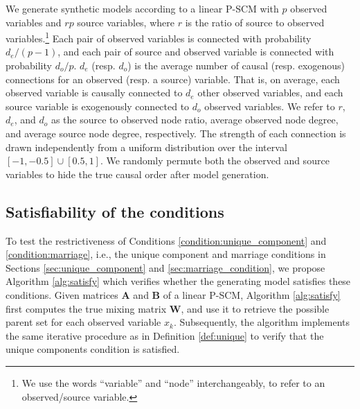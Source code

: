 \documentclass[12pt]{article}
\newcommand{\bA}{\mathbf{A}}
\newcommand{\bB}{\mathbf{B}}
\newcommand{\bW}{\mathbf{W}}
\begin{document}
We generate synthetic models according to a linear P-SCM with $p$ observed variables and $rp$ source variables, where $r$ is the ratio of source to observed variables.\footnote{We use the words ``variable'' and ``node'' interchangeably, to refer to an observed/source variable.} Each pair of observed variables is connected with probability $d_e/(p-1)$, and each pair of source and observed variable is connected with probability $d_o/p$. $d_e$ (resp. $d_o$) is the average number of causal (resp. exogenous) connections for an observed (resp. a source) variable. That is, on average, each observed variable is causally connected to $d_e$ other observed variables, and each source variable is exogenously connected to $d_o$ observed variables. We refer to $r$, $d_e$, and $d_o$ as the source to observed node ratio, average observed node degree, and average source node degree, respectively. The strength of each connection is drawn independently from a uniform distribution over the interval $[-1, -0.5]\cup [0.5, 1]$. We randomly permute both the observed and source variables to hide the true causal order after model generation.

\subsection{Satisfiability of the conditions}\label{app:simulation_satisfiability}

To test the restrictiveness of Conditions \ref{condition:unique_component} and \ref{condition:marriage}, i.e., the unique component and marriage conditions in Sections \ref{sec:unique_component} and \ref{sec:marriage_condition}, we propose Algorithm \ref{alg:satisfy} which verifies whether the generating model satisfies these conditions. Given matrices $\bA$ and $\bB$ of a linear P-SCM, Algorithm \ref{alg:satisfy} first computes the true mixing matrix $\bW$, and use it to retrieve the possible parent set for each observed variable $x_k$. Subsequently, the algorithm implements the same iterative procedure as in Definition \ref{def:unique} to verify that the unique components condition is satisfied. 
\end{document}
